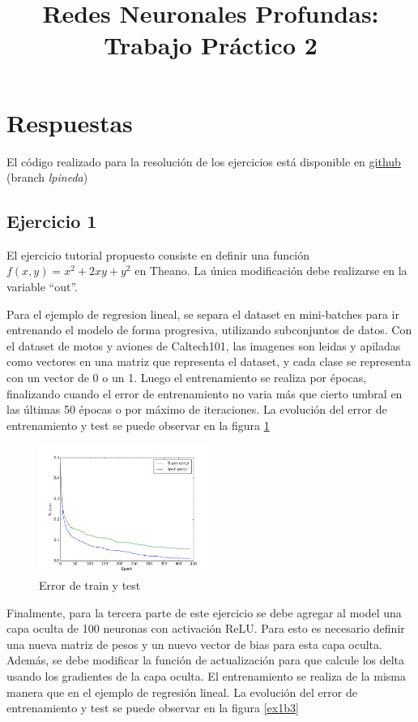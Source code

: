 \documentclass[11pt,spanish]{article}
\begin{document}
\title{Redes Neuronales Profundas: Trabajo Práctico 2}
\date{}
\maketitle

\section*{Respuestas}
El código realizado para la resolución de los ejercicios está disponible en \href{https://github.com/dncampo/deep-learning/tree/lpineda}{github} (branch \textit{lpineda})

\subsection*{Ejercicio 1}
El ejercicio tutorial propuesto consiste en definir una función $f(x,y) = x^2+2xy+y^2$ en Theano. La única modificación debe realizarse en la variable ``out''. \par

Para el ejemplo de regresion lineal, se separa el dataset en mini-batches para ir entrenando el modelo de forma progresiva, utilizando subconjuntos de datos. 
Con el dataset de motos y aviones de Caltech101, las imagenes son leidas y apiladas como vectores en una matriz que representa el dataset, y cada clase se representa con un vector de 0 o un 1. Luego el entrenamiento se realiza por épocas, finalizando cuando el error de entrenamiento no varia más que cierto umbral en las últimas 50 épocas o por máximo de iteraciones. La evolución del error de entrenamiento y test se puede observar en la figura \ref{ex1b2}
\begin{figure}[htbp]
	\centering
	\includegraphics[width=0.5\textwidth]{../ex1b2.png}
	\caption{Error de train y test}
	\label{ex1b2}
\end{figure}

Finalmente, para la tercera parte de este ejercicio se debe agregar al model una capa oculta de 100 neuronas con activación ReLU. Para esto es necesario definir una nueva matriz de pesos y un nuevo vector de bias para esta capa oculta. Además, se debe modificar la función de actualización para que calcule los delta usando los gradientes de la capa oculta. El entrenamiento se realiza de la misma manera que en el ejemplo de regresión lineal. La evolución del error de entrenamiento y test se puede observar en la figura \ref{ex1b3}
\end{document}
